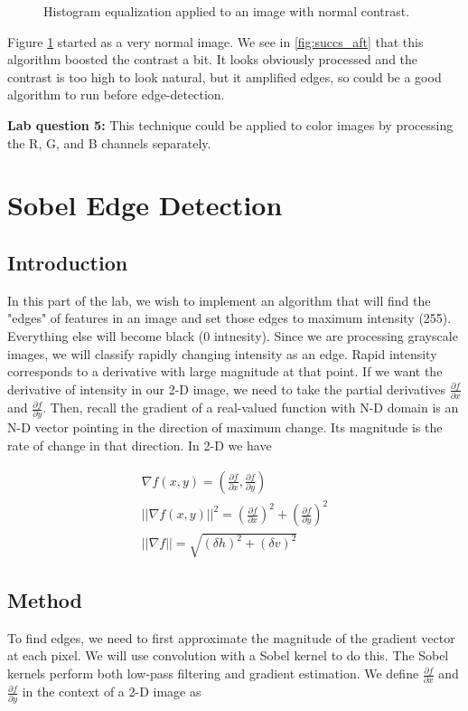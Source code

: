 \documentclass[11pt,a4paper]{article}
\begin{document}
\begin{figure}[ht]
	\caption{Histogram equalization applied to an image with normal contrast.}
	\label{fig:ce_norm_succs}
\end{figure}

Figure \ref{fig:ce_norm_succs} started as a very normal image. We see in \ref{fig:succs_aft} that this algorithm boosted the contrast a bit. It looks obviously processed and the contrast is too high to look natural, but it amplified edges, so could be a good algorithm to run before edge-detection.

\textbf{Lab question 5:} This technique could be applied to color images by processing the R, G, and B channels separately.

\clearpage

\section{Sobel Edge Detection}
\subsection{Introduction}
In this part of the lab, we wish to implement an algorithm that will find the "edges" of features in an image and set those edges to maximum intensity (255). Everything else will become black (0 intnesity). Since we are processing grayscale images, we will classify rapidly changing intensity as an edge. Rapid intensity corresponds to a derivative with large magnitude at that point. If we want the derivative of intensity in our 2-D image, we need to take the partial derivatives $\frac{\partial f}{\partial x}$ and $\frac{\partial f}{\partial y}$. Then, recall the gradient of a real-valued function with N-D domain is an N-D vector pointing in the direction of maximum change. Its magnitude is the rate of change in that direction. In 2-D we have

\begin{align}
\nabla f(x,y) = \left(\frac{\partial f}{\partial x}, \frac{\partial f}{\partial y} \right) \nonumber \\
||\nabla f(x,y)||^2 = \left( \frac{\partial f}{\partial x} \right)^2 + \left( \frac{\partial f}{\partial y} \right)^2 \nonumber \\
||\nabla f|| = \sqrt{(\delta h)^2 + (\delta v)^2} \label{eq:grad}
\end{align}

\subsection{Method}
To find edges, we need to first approximate the magnitude of the gradient vector at each pixel. We will use convolution with a Sobel kernel to do this. The Sobel kernels perform both low-pass filtering and gradient estimation. We define $\frac{\partial f}{\partial x}$ and $\frac{\partial f}{\partial y}$ in the context of a 2-D image as
\end{document}
